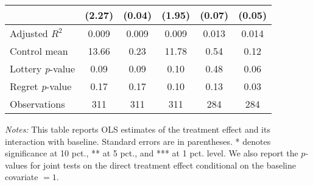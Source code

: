 \begin{table}[ht]
{\begin{threeparttable}
\begin{tabular}{l*{5}{c}}
                &   (2.27)         &   (0.04)         &   (1.95)         &   (0.07)         &   (0.05)         \\
\midrule
Adjusted \(R^{2}\)&    0.009         &    0.009         &    0.009         &    0.013         &    0.014         \\
Control mean    &    13.66         &     0.23         &    11.78         &     0.54         &     0.12         \\
Lottery \emph{p}-value&     0.09         &     0.09         &     0.10         &     0.48         &     0.06         \\
Regret \emph{p}-value&     0.17         &     0.17         &     0.10         &     0.13         &     0.03         \\
Observations    &      311         &      311         &      311         &      284         &      284         \\
\bottomrule \end{tabular} \begin{tablenotes}[flushleft] \footnotesize \item \emph{Notes:} This table reports OLS estimates of the treatment effect and its interaction with baseline. Standard errors are in parentheses. * denotes significance at 10 pct., ** at 5 pct., and *** at 1 pct. level. We also report the \(p\)-values for joint tests on the direct treatment effect conditional on the baseline covariate $= 1$. \end{tablenotes} \end{threeparttable} } \end{table}

